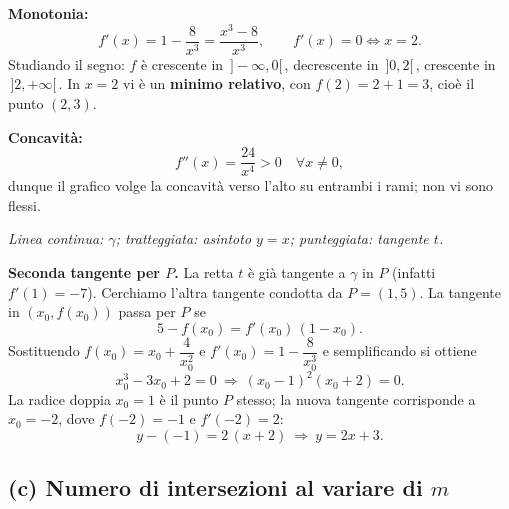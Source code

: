 \documentclass[11pt]{article}
\begin{document}
\textbf{Monotonia:}
\[
f'(x)=1-\frac{8}{x^3}=\frac{x^3-8}{x^3},\qquad f'(x)=0\iff x=2.
\]
Studiando il segno: $f$ \`e crescente in $\,]-\infty,0[\,$, decrescente in $\,]0,2[\,$,
crescente in $\,]2,+\infty[\,$. In $x=2$ vi \`e un \textbf{minimo relativo}, con
$f(2)=2+1=3$, cio\`e il punto $(2,3)$.

\textbf{Concavit\`a:}
\[
f''(x)=\frac{24}{x^4}>0\quad\forall x\neq0,
\]
dunque il grafico volge la concavit\`a verso l'alto su entrambi i rami; non vi sono flessi.

\begin{center}
\end{center}

\emph{Linea continua: $\gamma$; tratteggiata: asintoto $y=x$; punteggiata: tangente $t$.}

\medskip

\textbf{Seconda tangente per $P$.} La retta $t$ \`e gi\`a tangente a $\gamma$ in $P$
(infatti $f'(1)=-7$). Cerchiamo l'altra tangente condotta da $P=(1,5)$.
La tangente in $(x_0,f(x_0))$ passa per $P$ se
\[
5-f(x_0)=f'(x_0)\,(1-x_0).
\]
Sostituendo $f(x_0)=x_0+\dfrac{4}{x_0^2}$ e $f'(x_0)=1-\dfrac{8}{x_0^3}$ e
semplificando si ottiene
\[
x_0^3-3x_0+2=0\ \Longrightarrow\ (x_0-1)^2(x_0+2)=0.
\]
La radice doppia $x_0=1$ \`e il punto $P$ stesso; la nuova tangente corrisponde a
$x_0=-2$, dove $f(-2)=-1$ e $f'(-2)=2$:
\[
y-(-1)=2\,(x+2)\ \Longrightarrow\ \boxed{y=2x+3.}
\]

\subsection*{(c) Numero di intersezioni al variare di \texorpdfstring{$m$}{m}}
\end{document}
